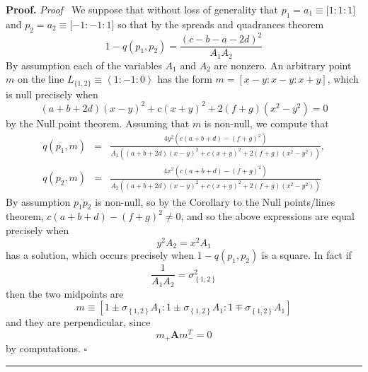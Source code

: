 \documentclass{unswthesis}
\newenvironment{proof}[1][Proof]{\noindent\textbf{#1.} }{\ \rule{0.5em}{0.5em}}
\begin{document}
\begin{proof}
\textit{Proof \ }We suppose that without loss of generality that $%
p_{1}=a_{1}\equiv \lbrack 1:1:1]$ and $p_{2}=a_{2}\equiv \lbrack -1:-1:1]$
so that by the spreads and quadrances theorem%
\begin{equation*}
1-q(p_{1},p_{2})=\frac{(c-b-a-2d)^{2}}{A_{1}A_{2}} 
\end{equation*}%
By assumption each of the variables $A_{1}$ and $A_{2}$ are nonzero. An
arbitrary point $m$ on the line $L_{\{1,2\}}\equiv \left\langle
1:-1:0\right\rangle $ has the form $m=[x-y:x-y:x+y]$, which is null
precisely when 
\begin{equation*}
(a+b+2d)(x-y)^{2}+c(x+y)^{2}+2\left( f+g\right) (x^{2}-y^{2})=0 
\end{equation*}%
by the Null point theorem. Assuming that $m$ is non-null, we compute that%
\begin{eqnarray*}
q(p_{1},m) &=&\frac{4y^{2}\left( c\left( a+b+d\right) -\left( f+g\right)
^{2}\right) }{A_{1}\left( (a+b+2d)(x-y)^{2}+c(x+y)^{2}+2\left( f+g\right)
(x^{2}-y^{2})\right) }, \\
q(p_{2},m) &=&\frac{4x^{2}\left( c\left( a+b+d\right) -\left( f+g\right)
^{2}\right) }{A_{2}\left( (a+b+2d)(x-y)^{2}+c(x+y)^{2}+2\left( f+g\right)
(x^{2}-y^{2})\right) }
\end{eqnarray*}%
\linebreak By assumption $\overline{p_{1}p_{2}}$ is non-null, so by the
Corollary to the Null points/lines theorem, $c\left( a+b+d\right) -\left(
f+g\right) ^{2}\neq 0$, and so the above expressions are equal precisely
when 
\begin{equation*}
y^{2}A_{2}=x^{2}A_{1} 
\end{equation*}%
has a solution, which occurs precisely when $1-q(p_{1},p_{2})$ is a square.
In fact if%
\begin{equation*}
\frac{1}{A_{1}A_{2}}=\sigma _{\left\{ 1,2\right\} }^{2} 
\end{equation*}%
then the two midpoints are%
\begin{equation*}
m\equiv \left[ 1\pm \sigma _{\left\{ 1,2\right\} }A_{1}:1\pm \sigma
_{\left\{ 1,2\right\} }A_{1}:1\mp \sigma _{\left\{ 1,2\right\} }A_{1}\right] 
\end{equation*}%
and they are perpendicular, since%
\begin{equation*}
m_{+}\mathbf{A}m_{-}^{T}=0 
\end{equation*}%
by computations. $\square $
\end{proof}
\end{document}
